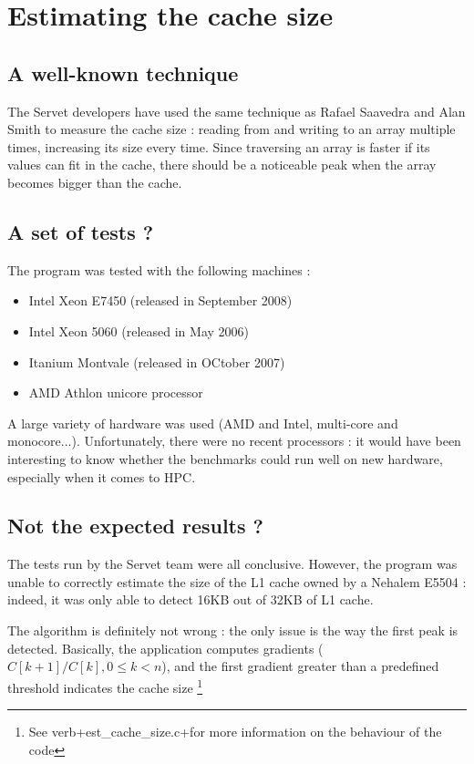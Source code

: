 \section{Estimating the cache size}

\subsection{A well-known technique}
The Servet developers have used the same technique as Rafael Saavedra and Alan
Smith\cite{Cache_TLB} to measure the cache size : reading from and writing to an
array multiple times, increasing its size every time. Since traversing an array
is faster if its values can fit in the cache, there should be a noticeable peak
when the array becomes bigger than the cache.

\subsection{A set of tests ?}
The program was tested with the following machines :
    \begin{itemize}
        \item Intel Xeon E7450 (released in September 2008)
        \item Intel Xeon 5060 (released in May 2006)
        \item Itanium Montvale (released in OCtober 2007)
        \item AMD Athlon unicore processor
    \end{itemize}

A large variety of hardware was used (AMD and Intel, multi-core and
monocore...). Unfortunately, there were no recent processors : it would have
been interesting to know whether the benchmarks could run well on new hardware,
especially when it comes to HPC.

\subsection{Not the expected results ?}
The tests run by the Servet team  were all conclusive. However, the program was
unable to correctly estimate the size of the L1 cache owned by a Nehalem E5504 :
indeed, it was only able to detect 16KB out of 32KB of L1 cache.

The algorithm is definitely not wrong : the only issue is the way the first
peak is detected. Basically, the application computes gradients ($ C[k+1]/C[k],
0 \le k < n $), and the first gradient greater than a predefined threshold
indicates the cache size \footnote{See verb+est\_cache\_size.c+for more
information on the behaviour of the code}

